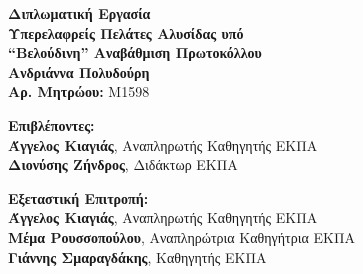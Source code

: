 \begin{center}
    \vspace{3cm}
    \large \textbf{Διπλωματική Εργασία}\\
    \vspace{3cm}
    \textbf{Υπερελαφρείς Πελάτες Αλυσίδας υπό \\
    ``Βελούδινη'' Αναβάθμιση Πρωτοκόλλου}\\
    \vspace{3cm}
    \large \textbf{Ανδριάννα Πολυδούρη}\\
    \textbf{Αρ. Μητρώου:} M1598
 
    \begin{flushleft}
        \textbf{Επιβλέποντες:}\\ 
        \hspace{2cm}
        \textbf{Άγγελος Κιαγιάς}, Αναπληρωτής Καθηγητής ΕΚΠΑ\\
        \hspace{2cm}
        \textbf{Διονύσης Ζήνδρος}, Διδάκτωρ ΕΚΠΑ

        \textbf{Εξεταστική Επιτροπή:}\\ 
        \hspace{2cm}
        \textbf{Άγγελος Κιαγιάς}, Αναπληρωτής Καθηγητής ΕΚΠΑ\\
        \hspace{2cm}
        \textbf{Μέμα Ρουσσοπούλου}, Αναπληρώτρια Καθηγήτρια ΕΚΠΑ\\
        \hspace{2cm}
        \textbf{Γιάννης Σμαραγδάκης}, Καθηγητής ΕΚΠΑ

    \end{flushleft}
\end{center}


\pagebreak